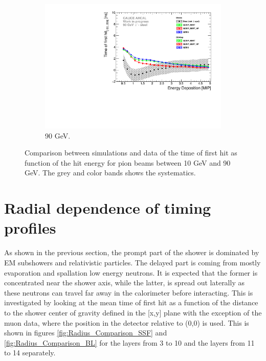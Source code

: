 \begin{figure}[htbp!]
\begin{subfigure}[t]{0.5\textwidth}
		\includegraphics[width=1\textwidth]{chap5/fig_AHCAL_timing/Pions/ComparisonToSim/Time_Energy_90GeV.pdf}
		\caption{90 GeV.} \label{fig:Energy_SimData_90GeV}
	\end{subfigure}
	\caption{Comparison between simulations and data of the time of first hit as function of the hit energy for pion beams between 10 GeV and 90 GeV. The grey and color bands shows the systematics.}
	\label{fig:Energy_SimData_Comparison}
\end{figure}

\section{Radial dependence of timing profiles}

As shown in the previous section, the prompt part of the shower is dominated by EM subshowers and relativistic particles. The delayed part is coming from mostly evaporation and spallation low energy neutrons. It is expected that the former is concentrated near the shower axis, while the latter, is spread out laterally as these neutrons can travel far away in the calorimeter before interacting. This is investigated by looking at the mean time of first hit as a function of the distance to the shower center of gravity defined in the [x,y] plane with the exception of the muon data, where the position in the detector relative to (0,0) is used. This is shown in figures \ref{fig:Radius_Comparison_SSF} and \ref{fig:Radius_Comparison_BL} for the layers from 3 to 10 and the layers from 11 to 14 separately.

